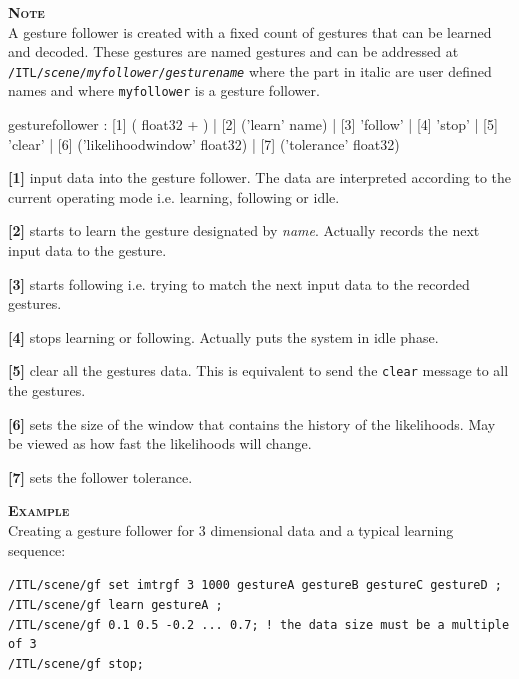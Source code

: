 \documentclass[a4paper,twoside]{report}
\newcommand{\OSC}[1]		{\texttt{#1}}
\newcommand{\example}		{\textbf{\hspace{-1.5cm}\textbf{\textsc{Example }}}}
\newcommand{\note}	[1]		{\vspace{2mm}\textbf{\hspace{-1.03cm}\textbf{\textsc{Note #1}}}}
\let\olditemize\itemize
\let\oldenditemize\enditemize
\renewenvironment{itemize} 	{\olditemize \setlength{\itemsep}{1mm}}{\oldenditemize}
\newcommand{\sample}	[1]			{\vspace{-2mm}\begin{center}\colorbox{mygrey}{
								\begin{minipage}[t]{0.9\columnwidth} 
								{\small \texttt{#1}}
								\end{minipage}}\end{center}}
\begin{document}
\note{} \\
A gesture follower is created with a fixed count of gestures that can be learned and decoded. These gestures are named gestures and can be addressed at \OSC{/ITL/\textit{scene}/\textit{myfollower}/\textit{gesturename}} where the part in italic are user defined names and where \OSC{myfollower} is a gesture follower.


\begin{rail}
gesturefollower :
		  [1] ( float32 + )
		| [2] ('learn' name)
		| [3] 'follow'
		| [4] 'stop'
		| [5] 'clear'
		| [6] ('likelihoodwindow' float32)
		| [7] ('tolerance' float32)
\end{rail}

\begin{itemize}
\item \textbf{[1]} input data into the gesture follower. The data are interpreted according to the current operating mode i.e. learning, following or idle.
\item \textbf{[2]} starts to learn the gesture designated by \emph{name}. Actually records the next input data to the gesture. 
\item \textbf{[3]} starts following i.e. trying to match the next input data to the recorded gestures.
\item \textbf{[4]} stops learning or following. Actually puts the system in idle phase.
\item \textbf{[5]} clear all the gestures data. This is equivalent to send the \OSC{clear} message to all the gestures. 
\item \textbf{[6]} sets the size of the window that contains the history of the likelihoods. May be viewed as how fast the likelihoods	will change.
\item \textbf{[7]} sets the follower tolerance. 
\end{itemize}

\example \\
Creating a gesture follower for 3 dimensional data and a typical learning sequence:
\sample{/ITL/scene/gf set imtrgf 3 1000 gestureA gestureB gestureC gestureD ;\\
/ITL/scene/gf learn gestureA ;\\
/ITL/scene/gf 0.1 0.5 -0.2 ... 0.7; ! the data size must be a multiple of 3\\
/ITL/scene/gf stop;
}
\end{document}
